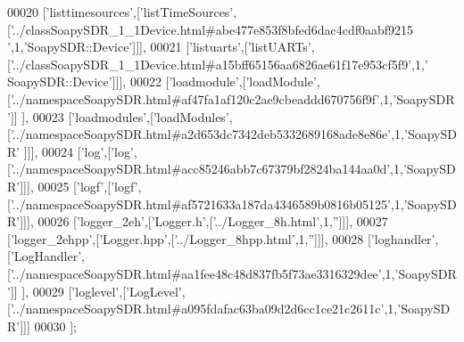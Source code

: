 \begin{DoxyCode}
00020   [\textcolor{stringliteral}{'listtimesources'},[\textcolor{stringliteral}{'listTimeSources'},[\textcolor{stringliteral}{'../classSoapySDR\_1\_1Device.html#abe477e853f8bfed6dac4cdf0aabf9215
      '},1,\textcolor{stringliteral}{'SoapySDR::Device'}]]],
00021   [\textcolor{stringliteral}{'listuarts'},[\textcolor{stringliteral}{'listUARTs'},[\textcolor{stringliteral}{'../classSoapySDR\_1\_1Device.html#a15bff65156aa6826ae61f17e953cf5f9'},1,\textcolor{stringliteral}{'
      SoapySDR::Device'}]]],
00022   [\textcolor{stringliteral}{'loadmodule'},[\textcolor{stringliteral}{'loadModule'},[\textcolor{stringliteral}{'../namespaceSoapySDR.html#af47fa1af120c2ae9cbeaddd670756f9f'},1,\textcolor{stringliteral}{'SoapySDR'}]]
      ],
00023   [\textcolor{stringliteral}{'loadmodules'},[\textcolor{stringliteral}{'loadModules'},[\textcolor{stringliteral}{'../namespaceSoapySDR.html#a2d653dc7342deb5332689168ade8e86e'},1,\textcolor{stringliteral}{'SoapySDR'}
      ]]],
00024   [\textcolor{stringliteral}{'log'},[\textcolor{stringliteral}{'log'},[\textcolor{stringliteral}{'../namespaceSoapySDR.html#acc85246abb7c67379bf2824ba144aa0d'},1,\textcolor{stringliteral}{'SoapySDR'}]]],
00025   [\textcolor{stringliteral}{'logf'},[\textcolor{stringliteral}{'logf'},[\textcolor{stringliteral}{'../namespaceSoapySDR.html#af5721633a187da4346589b0816b05125'},1,\textcolor{stringliteral}{'SoapySDR'}]]],
00026   [\textcolor{stringliteral}{'logger\_2eh'},[\textcolor{stringliteral}{'Logger.h'},[\textcolor{stringliteral}{'../Logger\_8h.html'},1,\textcolor{stringliteral}{''}]]],
00027   [\textcolor{stringliteral}{'logger\_2ehpp'},[\textcolor{stringliteral}{'Logger.hpp'},[\textcolor{stringliteral}{'../Logger\_8hpp.html'},1,\textcolor{stringliteral}{''}]]],
00028   [\textcolor{stringliteral}{'loghandler'},[\textcolor{stringliteral}{'LogHandler'},[\textcolor{stringliteral}{'../namespaceSoapySDR.html#aa1fee48c48d837fb5f73ae3316329dee'},1,\textcolor{stringliteral}{'SoapySDR'}]]
      ],
00029   [\textcolor{stringliteral}{'loglevel'},[\textcolor{stringliteral}{'LogLevel'},[\textcolor{stringliteral}{'../namespaceSoapySDR.html#a095fdafac63ba09d2d6cc1ce21c2611c'},1,\textcolor{stringliteral}{'SoapySDR'}]]]
00030 ];
\end{DoxyCode}
